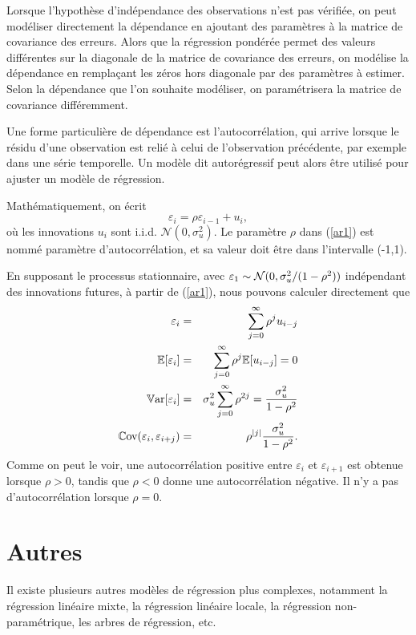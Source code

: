 Lorsque l'hypothèse d'indépendance des observations n'est pas vérifiée, on peut modéliser directement la dépendance en ajoutant des paramètres à la matrice de covariance des erreurs. Alors que la régression pondérée permet des valeurs différentes sur la diagonale de la matrice de covariance des erreurs, on modélise la dépendance en remplaçant les zéros hors diagonale par des paramètres à estimer. Selon la dépendance que l'on souhaite modéliser, on paramétrisera la matrice de covariance différemment.


Une forme particulière de dépendance est l'autocorrélation, qui arrive lorsque le résidu d'une observation est relié à celui de l'observation précédente, par exemple dans une série temporelle. Un modèle dit autorégressif peut alors être utilisé pour ajuster un modèle de régression.

Mathématiquement, on écrit
\begin{equation}\label{ar1}
\varepsilon_i=\rho\varepsilon_{i-1}+u_i, \end{equation} o\`u
les innovations $u_i$ sont i.i.d. $\mathcal{N}(0,\sigma_u^2)$. Le paramètre
$\rho$ dans (\ref{ar1}) est nommé paramètre
d'au\-to\-cor\-ré\-la\-tion, et sa valeur doit \^etre dans
l'intervalle (-1,1).

En supposant le processus stationnaire, avec $\varepsilon_1\sim\mathcal{N}(0,\sigma_u^2/(1-\rho^2))$ indépendant des innovations futures, à partir de (\ref{ar1}), nous pouvons
calculer directement que
\begin{eqnarray*}
\varepsilon_i&=&\sum_{j=0}^\infty\rho^ju_{i-j}\\
\mathbb{E}[\varepsilon_i]&=&\sum_{j=0}^\infty\rho^j\mathbb{E}[u_{i-j}]=0\\
\mathbb{V}\text{ar}[\varepsilon_i]&=&\sigma_u^2\sum_{j=0}^\infty\rho^{2j}={\sigma_u^2\over1-\rho^2}\\
\mathbb{C}\text{ov}(\varepsilon_i,\varepsilon_{i+j})&=&\rho^{|j|}{\sigma_u^2\over1-\rho^2}.
\end{eqnarray*}
Comme on peut le voir, une autocorrélation positive entre
$\varepsilon_i$ et $\varepsilon_{i+1}$ est obtenue lorsque $\rho>0$,
tandis que $\rho<0$ donne une autocorrélation négative. Il n'y a
pas d'autocorrélation lorsque $\rho=0$.




\section{Autres}

Il existe plusieurs autres modèles de régression plus complexes, notamment la régression linéaire mixte, la régression linéaire locale, la régression non-paramétrique, les arbres de régression, etc. 
